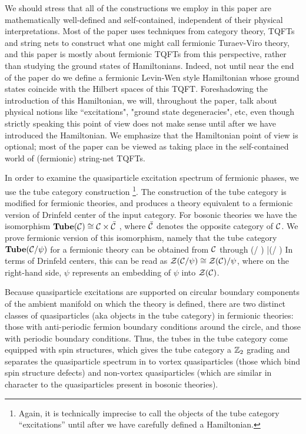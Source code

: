 We should stress that all of the constructions we employ in this paper are mathematically well-defined and 
self-contained, independent of their physical interpretations. 
Most of the paper uses techniques from category theory, TQFTs and string nets to construct what one
might call fermionic Turaev-Viro theory, and this paper is mostly about fermionic TQFTs from this perspective, 
rather than studying the ground states of Hamiltonians. 
Indeed, not until near the end of the paper do we define a fermionic Levin-Wen style Hamiltonian whose ground states coincide with 
the Hilbert spaces of this TQFT.
Foreshadowing the introduction of this Hamiltonian, we will, throughout the paper, talk about physical notions like ``excitations", "ground state degeneracies", 
etc, even though
strictly speaking this point of view does not make sense until after we have introduced the Hamiltonian.
We emphasize that the Hamiltonian point of view is optional; most of the paper can be viewed as taking place
in the self-contained world of (fermionic) string-net TQFTs.

In order to examine the quasiparticle excitation spectrum of fermionic phases, 
we use the tube category construction \cite{ocneanu1994}\footnote{Again, it is technically imprecise to call the objects 
of the tube category ``excitations'' until after we have carefully defined a Hamiltonian.}.
The construction of the tube category is modified for fermionic theories, and produces a theory
equivalent to a fermionic version of Drinfeld center of the input category.
For bosonic theories we have the isomorphism $\textbf{Tube}(\mathcal{C})\cong\mathcal{C}\times\bar{\mathcal{C}}$ \cite{muger2003b}, where $\bar{\mathcal{C}}$ denotes the opposite category of $\mathcal{C}$. 
We prove fermionic version of this isomorphism, namely 
that the tube category $\textbf{Tube}(\mathcal{C}/\psi)$ for a fermionic theory can be obtained from $\mathcal{C}$ through
\be \tube(\mcc / \psi) \cong \bar{\mcc \times (\mcc / \psi)}\ee
In terms of Drinfeld centers, this can be read as $\mathcal{Z}(\mathcal{C} / \psi)\cong \mathcal{Z}(\mathcal{C})/\psi$, where on the right-hand side, 
$\psi$ represents an embedding of $\psi$ into $\mathcal{Z}(\mathcal{C})$.


Because quasiparticle excitations are supported on circular boundary components of the ambient 
manifold on which the theory is defined, there are two distinct classes of quasiparticles (aka objects in the tube category) in 
fermionic theories: those with anti-periodic fermion boundary conditions around the circle, and 
those with periodic boundary conditions. 
Thus, the tubes in the tube category come equipped with spin structures, which gives the tube category a $\mathbb{Z}_2$ grading
and separates the quasiparticle spectrum in to vortex quasiparticles (those which bind spin structure defects) 
and non-vortex quasiparticles (which are similar in character to the quasiparticles present in bosonic theories). 






